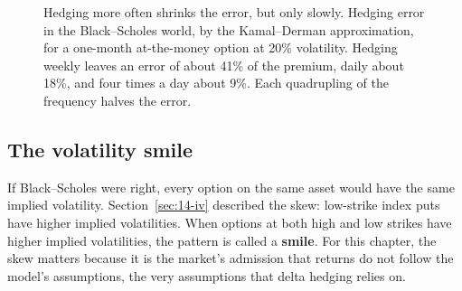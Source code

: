 \begin{figure}[htbp]
\centering
{}
\caption{Hedging more often shrinks the error, but only slowly. Hedging error in the Black--Scholes world, by the Kamal--Derman approximation, for a one-month at-the-money option at 20\% volatility. Hedging weekly leaves an error of about 41\% of the premium, daily about 18\%, and four times a day about 9\%. Each quadrupling of the frequency halves the error.}
\label{fig:14-freq}
\end{figure}

\subsection{The volatility smile}

If Black--Scholes were right, every option on the same asset would have the same implied volatility. Section~\ref{sec:14-iv} described the skew: low-strike index puts have higher implied volatilities. When options at both high and low strikes have higher implied volatilities, the pattern is called a \textbf{smile}. For this chapter, the skew matters because it is the market's admission that returns do not follow the model's assumptions, the very assumptions that delta hedging relies on.

